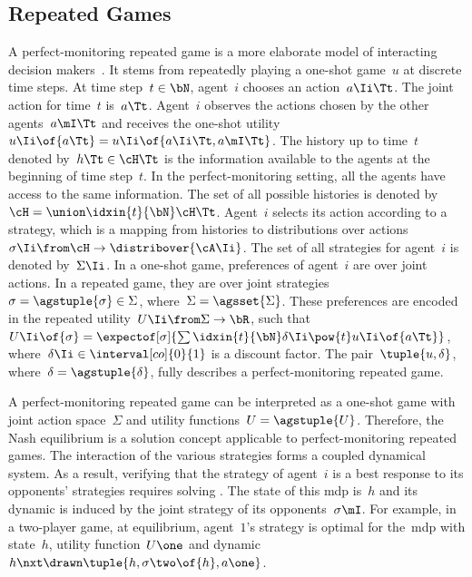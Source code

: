 \subsection{Repeated Games}

A perfect-monitoring repeated game is a more elaborate model of interacting decision makers~\cite{mailath_samuelson:2006}.
It stems from repeatedly playing a one-shot game~\(u\) at discrete time steps.
At time step~\(t \in \bN\), agent~\(i\) chooses an action~\(a\Ii\Tt\).
The joint action for time~\(t\) is~\(a\Tt\).
Agent~\(i\) observes the actions chosen by the other agents~\(a\mI\Tt\) and receives the one-shot utility~\(u\Ii \of{a\Tt} = u\Ii \of{a\Ii\Tt, a\mI\Tt}\).
The history up to time~\(t\) denoted by~\(h\Tt \in \cH\Tt\) is the information available to the agents at the beginning of time step~\(t\).
In the perfect-monitoring setting, all the agents have access to the same information.
The set of all possible histories is denoted by~\(\cH = \union\idxin{t}{\bN} \cH\Tt\).
Agent~\(i\) selects its action according to a strategy, which is a mapping from histories to distributions over actions~\(\sigma\Ii \from \cH \to \distribover{\cA\Ii}\).
The set of all strategies for agent~\(i\) is denoted by~\(\Sigma\Ii\).
In a one-shot game, preferences of agent~\(i\) are over joint actions.
In a repeated game, they are over joint strategies~\(\sigma = \agstuple{\sigma} \in \Sigma\), where~\(\Sigma = \agsset{\Sigma}\).
These preferences are encoded in the repeated utility~\(U\Ii \from \Sigma \to \bR\), such that~\(U\Ii \of{\sigma} = \expectof[\sigma]{\sum\idxin{t}{\bN} \delta\Ii\pow{t} u\Ii \of{a\Tt}}\), where~\(\delta\Ii \in \interval[co]{0}{1}\) is a discount factor.
The pair~\(\tuple{u, \delta}\), where~\(\delta = \agstuple{\delta}\), fully describes a perfect-monitoring repeated game.

A perfect-monitoring repeated game can be interpreted as a one-shot game with joint action space~\(\Sigma\) and utility functions~\(U = \agstuple{U}\).
Therefore, the Nash equilibrium is a solution concept applicable to perfect-monitoring repeated games.
The interaction of the various strategies forms a coupled dynamical system.
As a result, verifying that the strategy of agent~\(i\) is a best response to its opponents' strategies requires solving .
The state of this \ac{mdp} is~\(h\) and its dynamic is induced by the joint strategy of its opponents~\(\sigma\mI\).
For example, in a two-player game, at equilibrium, agent~\(1\)'s strategy is optimal for the~\ac{mdp} with state~\(h\), utility function~\(U\one\) and dynamic~\(h\nxt \drawn \tuple{h, \sigma\two \of{h}, a\one}\).

